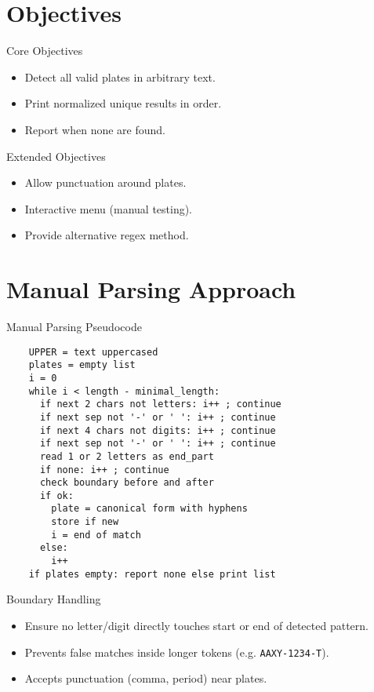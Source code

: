 \documentclass[aspectratio=169]{beamer}
\newcommand{\code}[1]{\texttt{#1}}
\begin{document}
\section{Objectives}

\begin{frame}{Core Objectives}
  \begin{itemize}
    \item Detect all valid plates in arbitrary text.
    \item Print normalized unique results in order.
    \item Report when none are found.
  \end{itemize}
\end{frame}

\begin{frame}{Extended Objectives}
  \begin{itemize}
    \item Allow punctuation around plates.
    \item Interactive menu (manual testing).
    \item Provide alternative regex method.
  \end{itemize}
\end{frame}

\section{Manual Parsing Approach}

\begin{frame}[fragile]{Manual Parsing Pseudocode}
\footnotesize
  \begin{verbatim}
    UPPER = text uppercased
    plates = empty list
    i = 0
    while i < length - minimal_length:
      if next 2 chars not letters: i++ ; continue
      if next sep not '-' or ' ': i++ ; continue
      if next 4 chars not digits: i++ ; continue
      if next sep not '-' or ' ': i++ ; continue
      read 1 or 2 letters as end_part
      if none: i++ ; continue
      check boundary before and after
      if ok:
        plate = canonical form with hyphens
        store if new
        i = end of match
      else:
        i++
    if plates empty: report none else print list
  \end{verbatim}
\end{frame}

\begin{frame}{Boundary Handling}
  \begin{itemize}
    \item Ensure no letter/digit directly touches start or end of detected pattern.
    \item Prevents false matches inside longer tokens (e.g. \code{AAXY-1234-T}).
    \item Accepts punctuation (comma, period) near plates.
  \end{itemize}
\end{frame}
\end{document}
